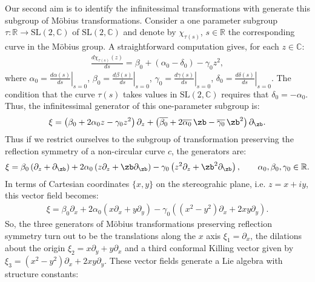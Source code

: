 Our second aim is to identify the infinitessimal transformations with
generate this subgroup of M\"obius transformations. Consider
a one parameter subgroup $\tau: \mathbb{R} \longrightarrow 
\mbox{SL}(2,\mathbb{C})$ of $\mbox{SL}(2,\mathbb{C})$
and denote by
$\chi_{\tau(s)}$, $s \in \mathbb{R}$ 
the corresponding curve in the M\"obius group. A straightforward
computation gives, for each $z \in \mathbb{C}$:
\begin{align*}
\frac{d \chi_{\tau(s)}(z)}{d s}  =
\beta_0 + \left ( \alpha_0 - \delta_0 \right ) - \gamma_0 z^2,
\end{align*}
where $\alpha_0 = \left . \frac{d \alpha(s)}{ds} \right |_{s=0}$,
$\beta_0 = \left . \frac{d \beta(s)}{ds} \right |_{s=0}$,
$\gamma_0 = \left . \frac{d \gamma(s)}{ds}\right |_{s=0}$,
$\delta_0 = \left . \frac{d \delta(s)}{ds}\right |_{s=0}$. The condition that
the curve $\tau(s)$ takes values in $\mbox{SL}(2,\mathbb{C})$ requires that $\delta_0
= - \alpha_0$. Thus, the infinitessimal generator of this one-parameter
subgroup  is:
\begin{align*}
\xi = 
\left ( \beta_0 + 2 \alpha_0 z - \gamma_0 z^2 \right )  \partial_z 
+ 
\left ( \overline{\beta_0} + 2 \overline{\alpha_0} \, \zb- 
\overline{\gamma_0} \, \zb^2 \right )  \partial_{\zb}.
\end{align*}
Thus if we restrict ourselves to the subgroup of transformation 
preserving the reflection symmetry of a non-circular curve $c$,
the generators are: 
\begin{align*}
\xi =  \beta_0 \left ( \partial_z + \partial_{\zb} \right )
+2 \alpha_0 \left ( z\partial_z + \zb \partial_{\zb} \right )
- \gamma_0 \left ( z^2\partial_z + \zb^2 \partial_{\zb} \right ),
\quad \quad 
\alpha_0,\beta_0,\gamma_0 \in \mathbb{R}.
\end{align*}
In terms of Cartesian coordinates $\{ x,y\}$  on the stereograhic plane,
i.e. $z = x + i y$, this vector field becomes:
\begin{align*}
\xi =  \beta_0 \partial_x 
+2 \alpha_0 \left ( x \partial_x + y \partial_y \right )
- \gamma_0 \left ( \left ( x^2 - y^2 \right ) \partial_x
+ 2 x y \partial_{y} \right ).
\end{align*}
So, the three generators of  M\"obius transformations preserving 
reflection symmetry turn out to be  the translations along the
$x$ axis $\xi_1 = \partial_x$, the dilations about the origin
$\xi_2 = x \partial_y + y \partial_x$ and a third conformal Killing vector
given by
$\xi_3 = (x^2 - y^2) \partial_x + 2 xy \partial_y$. These vector fields
generate a Lie algebra with structure constants:
